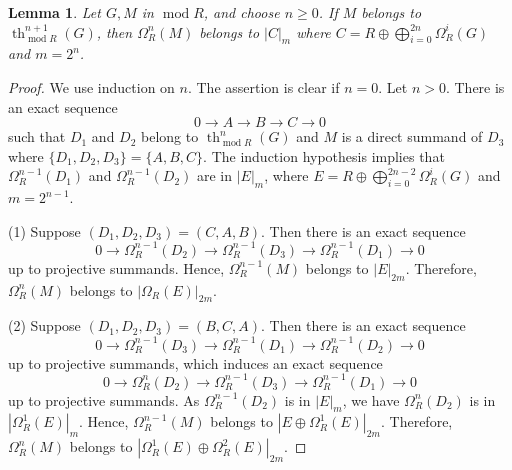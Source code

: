 \documentclass[11pt]{amsart}
\theoremstyle{plain}
\newtheorem{lemma}[theorem]{Lemma}
\theoremstyle{definition}
\numberwithin{equation}{section}
\numberwithin{theorem}{section}
\begin{document}
\begin{lemma}\label{lem:large_thickening_to_extension_decompositions}
    Let $G,M$ in $ \operatorname{mod}R$, and choose $n\geq 0$. If $M$ belongs to $\operatorname{th}_{\operatorname{mod}R}^{n+1}(G)$, then $\Omega_R^n (M)$ belongs to $|C|_m$ where $C=R\oplus\bigoplus_{i=0}^{2n}\Omega_R^i (G)$ and $m=2^n$.
\end{lemma}

\begin{proof}
    We use induction on $n$. The assertion is clear if $n=0$. Let $n>0$.
    There is an exact sequence
    \begin{displaymath}
        0 \to A \to B \to C \to 0
    \end{displaymath}
    such that $D_1$ and $D_2$ belong to $\operatorname{th}_{\operatorname{mod}R}^n (G)$ and $M$ is a direct summand of $D_3$
    where $\{D_1,D_2,D_3\}=\{A,B,C\}$. The induction hypothesis implies that
    $\Omega_R^{n-1}(D_1)$ and $\Omega_R^{n-1}(D_2)$ are in $|E|_m$, where
    $E=R\oplus\bigoplus_{i=0}^{2n-2}\Omega_R^i (G)$ and $m=2^{n-1}$.

    (1) Suppose $(D_1,D_2,D_3)=(C,A,B)$. Then there is an exact sequence
    \begin{displaymath}
        0 \to \Omega_R^{n-1}(D_2) \to \Omega_R^{n-1}(D_3) \to \Omega_R^{n-1}(D_1) \to 0
    \end{displaymath}
    up to projective summands. Hence, $\Omega_R^{n-1}(M)$ belongs to $|E|_{2m}$.
    Therefore, $\Omega_R^n (M)$ belongs to $|\Omega_R (E)|_{2m}$.

    (2) Suppose $(D_1,D_2,D_3)=(B,C,A)$. Then there is an exact sequence
    \begin{displaymath}
        0 \to \Omega_R^{n-1}(D_3) \to \Omega_R^{n-1}(D_1) \to \Omega_R^{n-1}(D_2) \to 0
    \end{displaymath}
    up to projective summands, which induces an exact sequence
    \begin{displaymath}
        0 \to \Omega_R^n (D_2) \to \Omega_R^{n-1}(D_3) \to \Omega_R^{n-1}(D_1) \to 0
    \end{displaymath}
    up to projective summands. As $\Omega_R^{n-1} (D_2)$ is in $|E|_m$, we have
    $\Omega^n_R (D_2)$ is in $|\Omega_R^1 (E)|_m$. Hence, $\Omega_R^{n-1}(M)$ belongs to $|E\oplus\Omega_R^1 (E)|_{2m}$. Therefore, $\Omega^n_R (M)$ belongs to $|\Omega_R^1 (E)\oplus\Omega_R^2(E)|_{2m}$.


\end{proof}
\end{document}
